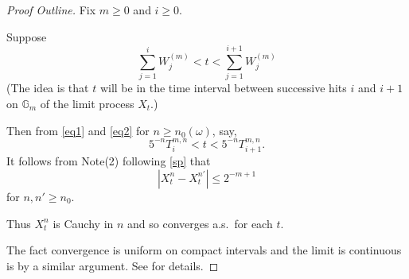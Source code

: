 \documentclass[a4paper]{amsart}
\theoremstyle{plain}
\theoremstyle{definition}
\theoremstyle{remark}
\begin{document}
\begin{proof}[Proof Outline]  Fix $ m \geq 0$ and $ i\geq 0 $.

Suppose 
\[   \sum_{j=1}^i W_j^{(m)} < t < \sum_{j=1}^{i+1}W_j^{(m)} \]
(The idea is that $ t $ will be in the time interval between successive hits $ i $ and $ i+1 $ on $ \mathbb{G}_m $ of the limit process $ X_t $.)

Then from \eqref{eq1} and \eqref{eq2} for $ n \geq n_0 (\omega)$, say, 
\[   5^{-n} T_i^{m,n} < t < 5^{-n} T_{i+1}^{m,n} .\]
It follows from Note(2) following \eqref{sp}  that 
\[ |X_t^n - X_t^{n'}| \leq 2^{-m+1}  \]
for $ n,n'\geq n_0 $.

Thus $X_t^n $ is Cauchy in $ n $ and so converges a.s.\ for each $  t$.

The fact convergence is uniform on compact intervals and the limit is continuous is by a similar argument.
See \cite{Bar1} for details.
\end{proof}



\end{document}
